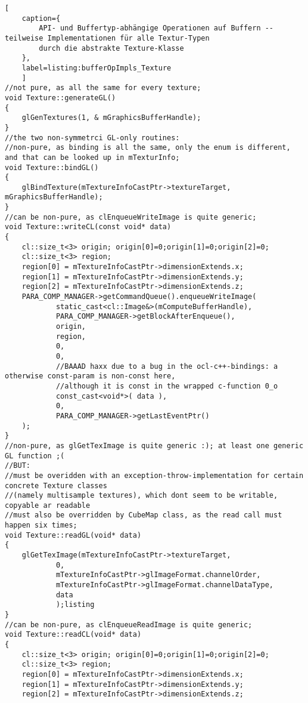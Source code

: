 \begin{lstlisting}[
	caption={
		API- und Buffertyp-abhängige Operationen auf Buffern -- teilweise Implementationen für alle Textur-Typen
		durch die abstrakte Texture-Klasse
	},	
	label=listing:bufferOpImpls_Texture
	]	
//not pure, as all the same for every texture;
void Texture::generateGL()
{
	glGenTextures(1, & mGraphicsBufferHandle);
}
//the two non-symmetrci GL-only routines:
//non-pure, as binding is all the same, only the enum is different, and that can be looked up in mTexturInfo;
void Texture::bindGL()
{
	glBindTexture(mTextureInfoCastPtr->textureTarget, mGraphicsBufferHandle);
}
//can be non-pure, as clEnqueueWriteImage is quite generic;
void Texture::writeCL(const void* data)
{
	cl::size_t<3> origin; origin[0]=0;origin[1]=0;origin[2]=0;
	cl::size_t<3> region;
	region[0] =	mTextureInfoCastPtr->dimensionExtends.x;
	region[1] =	mTextureInfoCastPtr->dimensionExtends.y;
	region[2] =	mTextureInfoCastPtr->dimensionExtends.z;
	PARA_COMP_MANAGER->getCommandQueue().enqueueWriteImage(
			static_cast<cl::Image&>(mComputeBufferHandle),
			PARA_COMP_MANAGER->getBlockAfterEnqueue(),
			origin,
			region,
			0,
			0,
			//BAAAD haxx due to a bug in the ocl-c++-bindings: a otherwise const-param is non-const here,
			//although it is const in the wrapped c-function 0_o
			const_cast<void*>( data ),
			0,
			PARA_COMP_MANAGER->getLastEventPtr()
	);
}
//non-pure, as glGetTexImage is quite generic :); at least one generic GL function ;(
//BUT:
//must be overidden with an exception-throw-implementation for certain concrete Texture classes
//(namely multisample textures), which dont seem to be writable, copyable ar readable
//must also be overridden by CubeMap class, as the read call must happen six times;
void Texture::readGL(void* data)
{
	glGetTexImage(mTextureInfoCastPtr->textureTarget,
			0,
			mTextureInfoCastPtr->glImageFormat.channelOrder,
			mTextureInfoCastPtr->glImageFormat.channelDataType,
			data
			);listing
}
//can be non-pure, as clEnqueueReadImage is quite generic;
void Texture::readCL(void* data)
{
	cl::size_t<3> origin; origin[0]=0;origin[1]=0;origin[2]=0;
	cl::size_t<3> region;
	region[0] =	mTextureInfoCastPtr->dimensionExtends.x;
	region[1] =	mTextureInfoCastPtr->dimensionExtends.y;
	region[2] =	mTextureInfoCastPtr->dimensionExtends.z;


\end{lstlisting}
